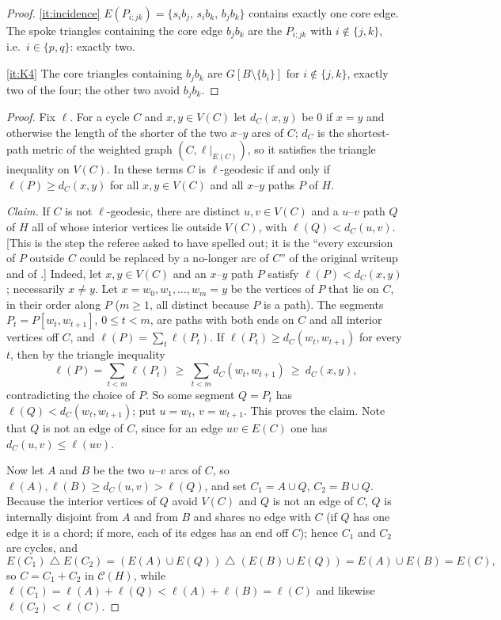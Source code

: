 \documentclass[11pt,a4paper]{article}
\theoremstyle{plain}
\theoremstyle{definition}
\theoremstyle{remark}
\newcommand{\cyc}{\mathcal C}
\newcommand{\dC}{d_C}
\newcommand{\symdiff}{\mathbin{\triangle}}
\begin{document}
\begin{proof}
\ref{it:incidence} $E(P_{i;jk})=\{s_ib_j,\,s_ib_k,\,b_jb_k\}$ contains exactly one core edge. The spoke triangles containing the core edge $b_jb_k$ are the $P_{i;jk}$ with $i\notin\{j,k\}$, i.e.\ $i\in\{p,q\}$: exactly two.

\ref{it:K4} The core triangles containing $b_jb_k$ are $G[B\setminus\{b_i\}]$ for $i\notin\{j,k\}$, exactly two of the four; the other two avoid $b_jb_k$.
\end{proof}

\label{pf:GS}
\thmGS*
\begin{proof}
Fix $\ell$. For a cycle $C$ and $x,y\in V(C)$ let $\dC(x,y)$ be $0$ if $x=y$ and otherwise the length of the shorter of the two $x$--$y$ arcs of $C$; $\dC$ is the shortest-path metric of the weighted graph $(C,\ell|_{E(C)})$, so it satisfies the triangle inequality on $V(C)$. In these terms $C$ is $\ell$-geodesic if and only if $\ell(P)\ge\dC(x,y)$ for all $x,y\in V(C)$ and all $x$--$y$ paths $P$ of $H$.

\emph{Claim.} If $C$ is not $\ell$-geodesic, there are distinct $u,v\in V(C)$ and a $u$--$v$ path $Q$ of $H$ all of whose interior vertices lie outside $V(C)$, with $\ell(Q)<\dC(u,v)$. [This is the step the referee asked to have spelled out; it is the ``every excursion of $P$ outside $C$ could be replaced by a no-longer arc of $C$'' of the original writeup and of \cite{GS09}.] Indeed, let $x,y\in V(C)$ and an $x$--$y$ path $P$ satisfy $\ell(P)<\dC(x,y)$; necessarily $x\ne y$. Let $x=w_0,w_1,\dots,w_m=y$ be the vertices of $P$ that lie on $C$, in their order along $P$ ($m\ge1$, all distinct because $P$ is a path). The segments $P_t=P[w_t,w_{t+1}]$, $0\le t<m$, are paths with both ends on $C$ and all interior vertices off $C$, and $\ell(P)=\sum_t\ell(P_t)$. If $\ell(P_t)\ge\dC(w_t,w_{t+1})$ for every $t$, then by the triangle inequality
\[
\ell(P)=\sum_{t<m}\ell(P_t)\ \ge\ \sum_{t<m}\dC(w_t,w_{t+1})\ \ge\ \dC(x,y),
\]
contradicting the choice of $P$. So some segment $Q=P_t$ has $\ell(Q)<\dC(w_t,w_{t+1})$; put $u=w_t$, $v=w_{t+1}$. This proves the claim. Note that $Q$ is not an edge of $C$, since for an edge $uv\in E(C)$ one has $\dC(u,v)\le\ell(uv)$.

Now let $A$ and $B$ be the two $u$--$v$ arcs of $C$, so $\ell(A),\ell(B)\ge\dC(u,v)>\ell(Q)$, and set $C_1=A\cup Q$, $C_2=B\cup Q$. Because the interior vertices of $Q$ avoid $V(C)$ and $Q$ is not an edge of $C$, $Q$ is internally disjoint from $A$ and from $B$ and shares no edge with $C$ (if $Q$ has one edge it is a chord; if more, each of its edges has an end off $C$); hence $C_1$ and $C_2$ are cycles, and
\[
E(C_1)\symdiff E(C_2)=(E(A)\cup E(Q))\symdiff(E(B)\cup E(Q))=E(A)\cup E(B)=E(C),
\]
so $C=C_1+C_2$ in $\cyc(H)$, while $\ell(C_1)=\ell(A)+\ell(Q)<\ell(A)+\ell(B)=\ell(C)$ and likewise $\ell(C_2)<\ell(C)$.


\end{proof}
\end{document}
